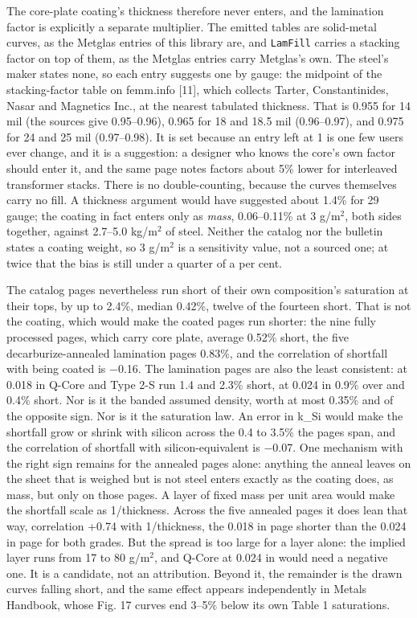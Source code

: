\documentclass[
  11pt,
]{article}
\newcounter{none} %
\begin{document}
The core-plate coating's thickness therefore never enters, and the lamination factor is explicitly a separate multiplier. The emitted tables are solid-metal curves, as the Metglas entries of this library are, and \texttt{LamFill} carries a stacking factor on top of them, as the Metglas entries carry Metglas's own. The steel's maker states none, so each entry suggests one by gauge: the midpoint of the stacking-factor table on femm.info {[}11{]}, which collects Tarter, Constantinides, Nasar and Magnetics Inc., at the nearest tabulated thickness. That is 0.955 for 14 mil (the sources give 0.95--0.96), 0.965 for 18 and 18.5 mil (0.96--0.97), and 0.975 for 24 and 25 mil (0.97--0.98). It is set because an entry left at 1 is one few users ever change, and it is a suggestion: a designer who knows the core's own factor should enter it, and the same page notes factors about 5\% lower for interleaved transformer stacks. There is no double-counting, because the curves themselves carry no fill. A thickness argument would have suggested about 1.4\% for 29 gauge; the coating in fact enters only as \emph{mass}, 0.06--0.11\% at 3 g/m\(^{2}\), both sides together, against 2.7--5.0 kg/m\(^{2}\) of steel. Neither the catalog nor the bulletin states a coating weight, so 3 g/m\(^{2}\) is a sensitivity value, not a sourced one; at twice that the bias is still under a quarter of a per cent.

The catalog pages nevertheless run short of their own composition's saturation at their tops, by up to 2.4\%, median 0.42\%, twelve of the fourteen short. That is not the coating, which would make the coated pages run shorter: the nine fully processed pages, which carry core plate, average 0.52\% short, the five decarburize-annealed lamination pages 0.83\%, and the correlation of shortfall with being coated is \(-\)0.16. The lamination pages are also the least consistent: at 0.018 in Q-Core and Type 2-S run 1.4 and 2.3\% short, at 0.024 in 0.9\% over and 0.4\% short. Nor is it the banded assumed density, worth at most 0.35\% and of the opposite sign. Nor is it the saturation law. An error in k\_Si would make the shortfall grow or shrink with silicon across the 0.4 to 3.5\% the pages span, and the correlation of shortfall with silicon-equivalent is \(-\)0.07. One mechanism with the right sign remains for the annealed pages alone: anything the anneal leaves on the sheet that is weighed but is not steel enters exactly as the coating does, as mass, but only on those pages. A layer of fixed mass per unit area would make the shortfall scale as 1/thickness. Across the five annealed pages it does lean that way, correlation +0.74 with 1/thickness, the 0.018 in page shorter than the 0.024 in page for both grades. But the spread is too large for a layer alone: the implied layer runs from 17 to 80 g/m\(^{2}\), and Q-Core at 0.024 in would need a negative one. It is a candidate, not an attribution. Beyond it, the remainder is the drawn curves falling short, and the same effect appears independently in Metals Handbook, whose Fig. 17 curves end 3--5\% below its own Table 1 saturations.
\end{document}
